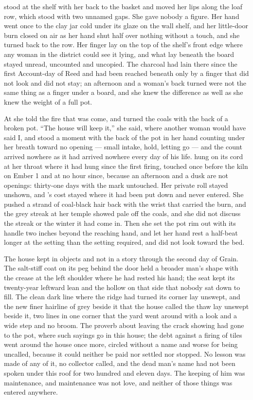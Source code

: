 \scenebreak

 stood at the shelf with her back to the basket and moved her lips along the loaf row, which stood with two unnamed gaps. She gave nobody a figure. Her hand went once to the clay jar cold under its glaze on the wall shelf, and her little-door burn closed on air as her hand shut half over nothing without a touch, and she turned back to the row. Her finger lay on the top of the shelf's front edge where any woman in the district could see it lying, and what lay beneath the board stayed unread, uncounted and uncopied. The charcoal had lain there since the first Account-day of Reed and had been reached beneath only by a finger that did not look and did not stay; an afternoon and a woman's back turned were not the same thing as a finger under a board, and she knew the difference as well as she knew the weight of a full pot.

At  she told the fire that  was come, and turned the coals with the back of a broken pot. “The house will keep it,” she said, where another woman would have said I, and stood a moment with the back of the pot in her hand counting under her breath toward no opening --- small intake, hold, letting go --- and the count arrived nowhere as it had arrived nowhere every day of his life.  hung on its cord at her throat where it had hung since the first firing, touched once before the kiln on Ember 1 and at no hour since, because an afternoon and a dusk are not openings: thirty-one days with the mark untouched. Her private roll stayed unshown, and 's cost stayed where it had been put down and never entered. She pushed a strand of coal-black hair back with the wrist that carried the burn, and the grey streak at her temple showed pale off the coals, and she did not discuss the streak or the winter it had come in. Then she set the pot rim out with its handle two inches beyond the reaching hand, and let her hand rest a half-beat longer at the setting than the setting required, and did not look toward the bed.

The house kept  in objects and not in a story through the second day of Grain. The salt-stiff coat on its peg behind the door held a broader man's shape with the crease at the left shoulder where he had rested his hand; the seat kept its twenty-year leftward lean and the hollow on that side that nobody sat down to fill. The clean dark line where the  ridge had turned its corner lay unswept, and the new finer hairline of grey beside it that the house called the thaw lay unswept beside it, two lines in one corner that the yard went around with a look and a wide step and no broom. The proverb about leaving the crack showing had gone to the pot, where such sayings go in this house; the debt against a firing of tiles went around the house once more, circled without a name and worse for being uncalled, because it could neither be paid nor settled nor stopped. No lesson was made of any of it, no collector called, and the dead man's name had not been spoken under this roof for two hundred and eleven days. The keeping of him was maintenance, and maintenance was not love, and neither of those things was entered anywhere.

